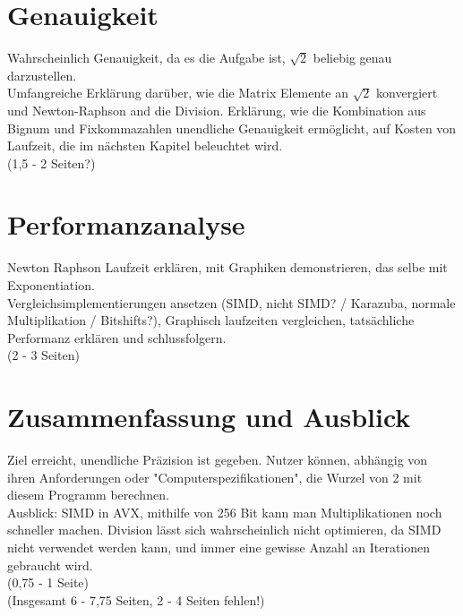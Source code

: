 \documentclass[course=erap]{aspdoc}
\begin{document}
\section{Genauigkeit} \label{sec:genauigkeit}
Wahrscheinlich Genauigkeit, da es die Aufgabe ist, $\sqrt{2}$ beliebig genau darzustellen. \\

Umfangreiche Erklärung darüber, wie die Matrix Elemente an $\sqrt{2}$ konvergiert und Newton-Raphson and die Division. Erklärung, wie die Kombination aus Bignum und Fixkommazahlen unendliche Genauigkeit 
ermöglicht, auf Kosten von Laufzeit, die im nächsten Kapitel beleuchtet wird. \\ 
(1,5 - 2 Seiten?)

\section{Performanzanalyse} \label{sec:performanz}
Newton Raphson Laufzeit erklären, mit Graphiken demonstrieren, das selbe mit Exponentiation. \\
Vergleichsimplementierungen ansetzen (SIMD, nicht SIMD? / Karazuba, normale Multiplikation / Bitshifts?), Graphisch laufzeiten vergleichen, tatsächliche Performanz erklären und schlussfolgern. \\
(2 - 3 Seiten)

\section{Zusammenfassung und Ausblick} \label{sec:zusammenfassung}
Ziel erreicht, unendliche Präzision ist gegeben. Nutzer können, abhängig von ihren Anforderungen oder "Computerspezifikationen", die Wurzel von 2 mit diesem Programm berechnen. \\
Ausblick: SIMD in AVX, mithilfe von 256 Bit kann man Multiplikationen noch schneller machen. Division lässt sich wahrscheinlich nicht optimieren, da SIMD nicht verwendet werden kann, 
und immer eine gewisse Anzahl an Iterationen gebraucht wird. \\
(0,75 - 1 Seite) \\
(Insgesamt 6 - 7,75 Seiten, 2 - 4 Seiten fehlen!)


{}
\end{document}
